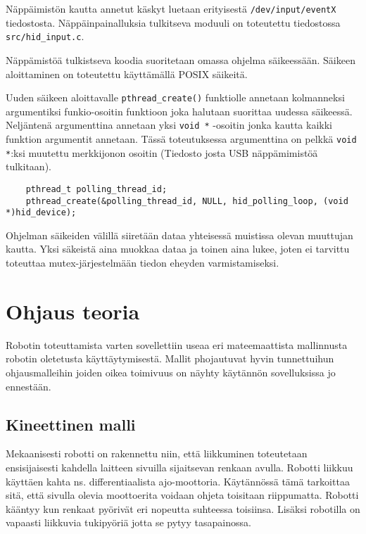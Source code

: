 \documentclass[]{article} %
\numberwithin{equation}{section}
\numberwithin{figure}{section}
\numberwithin{table}{section}
\begin{document}
Näppäimistön kautta annetut käskyt luetaan erityisestä \verb+/dev/input/eventX+ tiedostosta. Näppäinpainalluksia tulkitseva moduuli on toteutettu tiedostossa \verb+src/hid_input.c+.

Näppämistöä tulkistseva koodia suoritetaan omassa ohjelma säikeessään. Säikeen aloittaminen on toteutettu käyttämällä POSIX säikeitä.

Uuden säikeen aloittavalle \verb+pthread_create()+ funktiolle annetaan kolmanneksi argumentiksi funkio-osoitin funktioon joka halutaan suorittaa uudessa säikeessä. Neljäntenä argumenttina annetaan yksi \verb+void *+ -osoitin jonka kautta kaikki funktion argumentit annetaan. Tässä toteutuksessa argumenttina on pelkkä \verb+void *+:ksi muutettu merkkijonon osoitin (Tiedosto josta USB näppämimistöä tulkitaan).

\begin{verbatim}
    pthread_t polling_thread_id;
    pthread_create(&polling_thread_id, NULL, hid_polling_loop, (void *)hid_device);
\end{verbatim}

Ohjelman säikeiden välillä siiretään dataa yhteisessä muistissa olevan muuttujan kautta. Yksi säkeistä aina muokkaa dataa ja toinen aina lukee, joten ei tarvittu toteuttaa mutex-järjestelmään tiedon eheyden varmistamiseksi.

\section{Ohjaus teoria}
\label{sec:Ohjaus teoria}

Robotin toteuttamista varten sovellettiin useaa eri mateemaattista mallinnusta robotin oletetusta käyttäytymisestä.
Mallit phojautuvat hyvin tunnettuihun ohjausmalleihin joiden oikea toimivuus on näyhty käytännön sovelluksissa jo ennestään.
 

\subsection{Kineettinen malli}
\label{sub:Kineettinen malli}

Mekaanisesti robotti on rakennettu niin, että liikkuminen toteutetaan ensisijaisesti kahdella laitteen sivuilla sijaitsevan renkaan avulla.
Robotti liikkuu käyttäen kahta ns. differentiaalista ajo-moottoria.
Käytännössä tämä tarkoittaa sitä, että sivulla olevia moottoerita voidaan ohjeta toisitaan riippumatta.
Robotti kääntyy kun renkaat pyörivät eri nopeutta suhteessa toisiinsa.
Lisäksi robotilla on vapaasti liikkuvia tukipyöriä jotta se pytyy tasapainossa.
\end{document}
